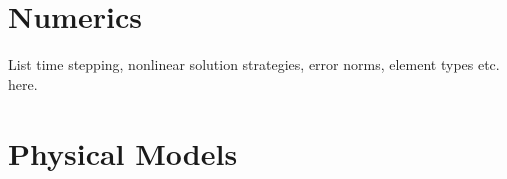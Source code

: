 \documentclass[11pt,twoside,fleqn,idxtotoc]{scrreprt}
\begin{document}
\author[1]{Lars Bilke}
\author[1]{Thomas Fischer}
\author[1,2]{Olaf Kolditz}
\author[1]{Thomas Nagel}
\author[1]{Karsten Rink}
\author[1]{Agnes Sachse}
\author[1]{Haibing Shao}
\author[1]{Norihiro Watanabe}
\makeatletter

\date{\today}



\tableofcontents
\clearpage



\chapter{Numerics}
List time stepping, nonlinear solution strategies, error norms, element types etc. here.
%
\chapter{Physical Models}


\printnomenclature%


\renewcommand{\indexname}{Keyword index}
\printindex

\cleardoublepage


\end{document}

